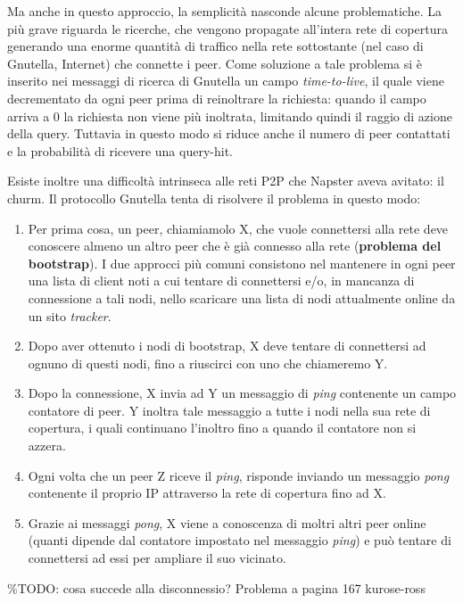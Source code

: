 Ma anche in questo approccio, la semplicità nasconde alcune
problematiche. La più grave riguarda le ricerche, che vengono propagate
all'intera rete di copertura generando una enorme quantità di traffico
nella rete sottostante (nel caso di Gnutella, Internet) che connette i
peer. Come soluzione a tale problema si è inserito nei messaggi di
ricerca di Gnutella un campo \emph{time-to-live}, il quale viene
decrementato da ogni peer prima di reinoltrare la richiesta: quando il
campo arriva a 0 la richiesta non viene più inoltrata, limitando quindi
il raggio di azione della query. Tuttavia in questo modo si riduce anche
il numero di peer contattati e la probabilità di ricevere una query-hit.

Esiste inoltre una difficoltà intrinseca alle reti P2P che Napster aveva
avitato: il churm. Il protocollo Gnutella tenta di risolvere il problema
in questo modo:

\begin{enumerate}
\def\labelenumi{\arabic{enumi}.}
\item
  Per prima cosa, un peer, chiamiamolo X, che vuole connettersi alla
  rete deve conoscere almeno un altro peer che è già connesso alla rete
  (\textbf{problema del bootstrap}). I due approcci più comuni
  consistono nel mantenere in ogni peer una lista di client noti a cui
  tentare di connettersi e/o, in mancanza di connessione a tali nodi,
  nello scaricare una lista di nodi attualmente online da un sito
  \emph{tracker}.
\item
  Dopo aver ottenuto i nodi di bootstrap, X deve tentare di connettersi
  ad ognuno di questi nodi, fino a riuscirci con uno che chiameremo Y.
\item
  Dopo la connessione, X invia ad Y un messaggio di \emph{ping}
  contenente un campo contatore di peer. Y inoltra tale messaggio a
  tutte i nodi nella sua rete di copertura, i quali continuano l'inoltro
  fino a quando il contatore non si azzera.
\item
  Ogni volta che un peer Z riceve il \emph{ping}, risponde inviando un
  messaggio \emph{pong} contenente il proprio IP attraverso la rete di
  copertura fino ad X.
\item
  Grazie ai messaggi \emph{pong}, X viene a conoscenza di moltri altri
  peer online (quanti dipende dal contatore impostato nel messaggio
  \emph{ping}) e può tentare di connettersi ad essi per ampliare il suo
  vicinato.
\end{enumerate}

\%TODO: cosa succede alla disconnessio? Problema a pagina 167
kurose-ross

